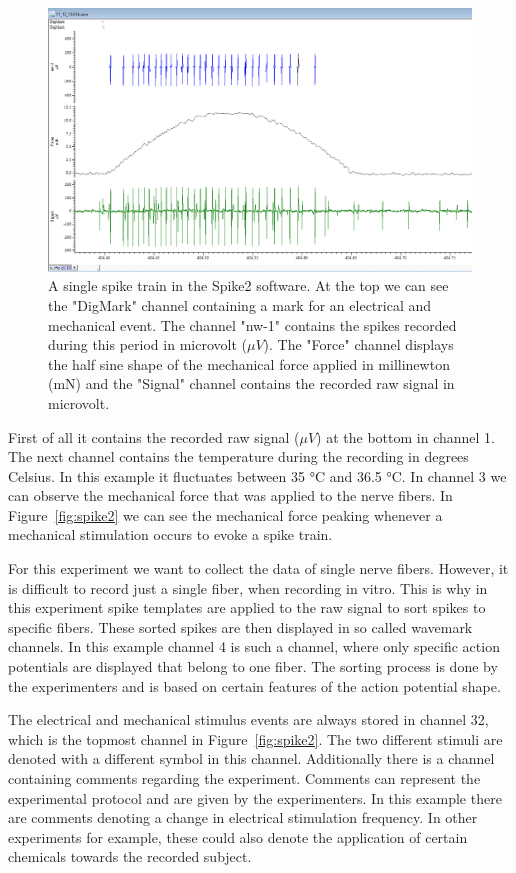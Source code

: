 \begin{figure}
	\includegraphics[width = \textwidth]{src/pic/Spike2_spike_train}
	\caption{A single spike train in the Spike2 software. At the top we can see the "DigMark" channel containing a mark for an electrical and mechanical event. The channel "nw-1" contains the spikes recorded during this period in microvolt ($\mu V$). The "Force" channel displays the half sine shape of the mechanical force applied in millinewton (mN) and the "Signal" channel contains the recorded raw signal in microvolt.}
	\label{fig:spike_train}
\end{figure}
First of all it contains the recorded raw signal ($\mu V$) at the bottom in channel 1. The next channel contains the temperature during the recording in degrees Celsius. In this example it fluctuates between 35 °C and 36.5 °C. In channel 3 we can observe the mechanical force that was applied to the nerve fibers. In Figure~\ref{fig:spike2} we can see the mechanical force peaking whenever a mechanical stimulation occurs to evoke a spike train. 

For this experiment we want to collect the data of single nerve fibers. However, it is difficult to record just a single fiber, when recording in vitro. This is why in this experiment spike templates are applied to the raw signal to sort spikes to specific fibers. These sorted spikes are then displayed in so called wavemark channels. In this example channel 4 is such a channel, where only specific action potentials are displayed that belong to one fiber. The sorting process is done by the experimenters and is based on certain features of the action potential shape.

The electrical and mechanical stimulus events are always stored in channel 32, which is the topmost channel in Figure~\ref{fig:spike2}. The two different stimuli are denoted with a different symbol in this channel. Additionally there is a channel containing comments regarding the experiment. Comments can represent the experimental protocol and are given by the experimenters. In this example there are comments denoting a change in electrical stimulation frequency. In other experiments for example, these could also denote the application of certain chemicals towards the recorded subject.

